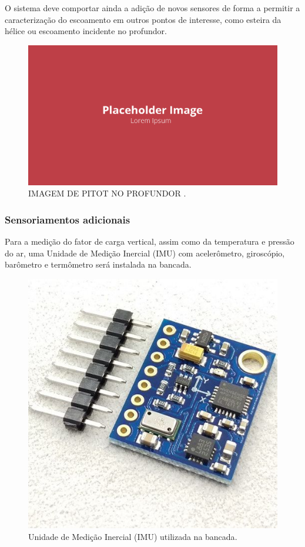 O sistema deve comportar ainda a adição de novos sensores de forma a permitir a caracterização do escoamento em outros pontos de interesse, como esteira da hélice ou escoamento incidente no profundor.

\begin{figure}[!ht]
    \centering
    \includegraphics[width=.8\linewidth]{figuras/outras/placeholder.png}
    \caption{IMAGEM DE PITOT NO PROFUNDOR \cite{autor}.}
    \label{fig:placeholder}
\end{figure}

\subsubsection{Sensoriamentos adicionais}

Para a medição do fator de carga vertical, assim como da temperatura e pressão do ar, uma Unidade de Medição Inercial (IMU) com acelerômetro, giroscópio, barômetro e termômetro será instalada na bancada.

\begin{figure}[!ht]
    \centering
    \includegraphics[width=.8\linewidth]{figuras/internet/IMU.jpg}
    \caption{Unidade de Medição Inercial (IMU) utilizada na bancada\cite{autor}.}
    \label{fig:placeholder}
\end{figure}

